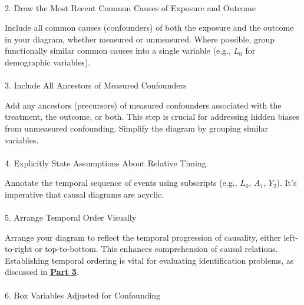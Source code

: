 \documentclass[
  singlecolumn]{article}
\makeatletter
\let\oldparagraph\paragraph
\renewcommand{\paragraph}{
    \@ifstar
      \xxxParagraphStar
      \xxxParagraphNoStar
  }
\newcommand{\xxxParagraphStar}[1]{\oldparagraph*{#1}\mbox{}}
\newcommand{\xxxParagraphNoStar}[1]{\oldparagraph{#1}\mbox{}}
\makeatother
\begin{document}
\paragraph{2. Draw the Most Recent Common Causes of Exposure and
Outcome}\label{draw-the-most-recent-common-causes-of-exposure-and-outcome}

Include all common causes (confounders) of both the exposure and the
outcome in your diagram, whether measured or unmeasured. Where possible,
group functionally similar common causes into a single variable (e.g.,
\(L_0\) for demographic variables).

\paragraph{3. Include All Ancestors of Measured
Confounders}\label{include-all-ancestors-of-measured-confounders}

Add any ancestors (precursors) of measured confounders associated with
the treatment, the outcome, or both. This step is crucial for addressing
hidden biases from unmeasured confounding. Simplify the diagram by
grouping similar variables.

\paragraph{4. Explicitly State Assumptions About Relative
Timing}\label{explicitly-state-assumptions-about-relative-timing}

Annotate the temporal sequence of events using subscripts (e.g.,
\(L_0\), \(A_1\), \(Y_2\)). It's imperative that causal diagrams are
acyclic.

\paragraph{5. Arrange Temporal Order
Visually}\label{arrange-temporal-order-visually}

Arrange your diagram to reflect the temporal progression of causality,
either left-to-right or top-to-bottom. This enhances comprehension of
causal relations. Establishing temporal ordering is vital for evaluating
identification problems, as discussed in
\hyperref[sec-part3]{\textbf{Part 3}}.

\paragraph{6. Box Variables Adjusted for
Confounding}\label{box-variables-adjusted-for-confounding}
\end{document}
